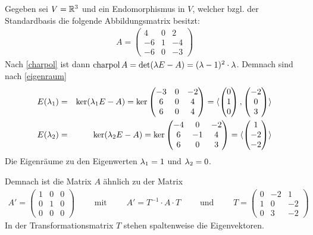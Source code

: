 Gegeben sei $V=\mathbb{R}^3$ und ein Endomorphismus in $V$, welcher bzgl. der Standardbasis die folgende Abbildungsmatrix besitzt:
\begin{align*}
    A =
    \begin{pmatrix}
        4 & 0 & 2\\
        -6 & 1 & -4\\
        -6 & 0 & -3
    \end{pmatrix}
\end{align*}
Nach \ref{charpol} ist dann $\text{charpol}\, A = \det(\lambda E-A)=(\lambda-1)^2\cdot \lambda$. Demnach sind nach \ref{eigenraum}
\begin{eqnarray*}
    E(\lambda_1) & = & \ker(\lambda_1 E-A) = \ker
    \begin{pmatrix}
        -3 & 0 & -2\\
        6 & 0 & 4\\
        6 & 0 & 4
    \end{pmatrix}
    = \langle
    \begin{pmatrix}
        0\\1\\0
    \end{pmatrix}
    ,
    \begin{pmatrix}
        -2\\0\\3
    \end{pmatrix}
    \rangle\\
    E(\lambda_2) & = & \ker (\lambda_2 E-A) = \ker
    \begin{pmatrix}
        -4 & 0 & -2\\
        6 & -1 & 4\\
        6 & 0 & 3
    \end{pmatrix}
    = \langle
    \begin{pmatrix}
        1\\-2\\-2
    \end{pmatrix}
    \rangle
\end{eqnarray*}
Die Eigenräume zu den Eigenwerten $\lambda_1=1$ und $\lambda_2=0$.

Demnach ist die Matrix $A$ ähnlich zu der Matrix
\begin{align*}
    A' =
    \begin{pmatrix}
        1 & 0 & 0\\
        0 & 1 & 0\\
        0 & 0 & 0
    \end{pmatrix}
    \qquad \mbox{ mit } \qquad 
    A' = T^{-1} \cdot A \cdot T \qquad \mbox{ und } \qquad
    T =
    \begin{pmatrix}
        0 & -2 & 1\\
        1 & 0 & -2\\
        0 & 3 & -2
    \end{pmatrix}
\end{align*}
In der Transformationsmatrix $T$ stehen spaltenweise die Eigenvektoren.\\

